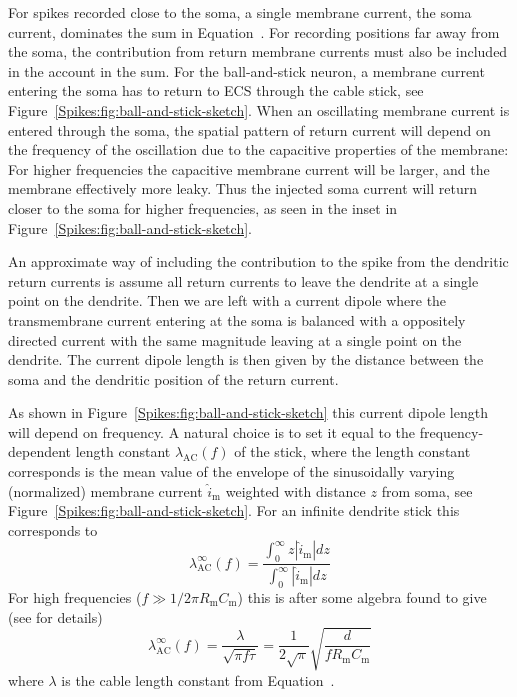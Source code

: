 For spikes recorded close to the soma, a single membrane current, the soma current,
dominates the sum in Equation~. 
For recording positions far away from the soma, the contribution from return membrane currents must also be included in the 
account in the sum. For the ball-and-stick neuron, a membrane current entering the soma has to return to ECS through the cable stick, see Figure~\ref{Spikes:fig:ball-and-stick-sketch}. When an oscillating membrane current is entered through the soma, the spatial pattern of return current will depend on the frequency of the oscillation due to the capacitive properties of the membrane: For higher frequencies the capacitive membrane current will be larger, and the membrane effectively more leaky. Thus the injected soma current will return closer to the soma for higher frequencies, as  seen in the inset in Figure~\ref{Spikes:fig:ball-and-stick-sketch}.  

An approximate way of including the contribution to the spike from the dendritic return currents is 
assume all return currents to leave the dendrite at a single point on the dendrite. Then we are left with
a current dipole where the transmembrane current entering at the soma is balanced with a oppositely directed current
with the same magnitude leaving at a single point on the dendrite. The current dipole length is then given by the distance
between the soma and the dendritic position of the return current. 

As shown in Figure~\ref{Spikes:fig:ball-and-stick-sketch} this current dipole length will depend on frequency.
A natural choice is to set it equal to the frequency-dependent length constant $\lambda_\mathrm{AC}(f)$ of the stick,
where the length constant corresponds is the mean value of the 
envelope of the sinusoidally varying (normalized) membrane current
$\hat{i}_\mathrm{m}$ weighted with distance $z$ from soma, see Figure~\ref{Spikes:fig:ball-and-stick-sketch}. 
For an infinite dendrite stick this corresponds to
%
\begin{equation}
  \lambda_\mathrm{AC}^\infty(f) = \frac{\int_0^\infty z |\hat{i}_\mathrm{m}| dz}{\int_0^\infty |\hat{i}_\mathrm{m}| dz} 
  \label{Spikes:equation:formula_lambda_ac}
\end{equation}
%
For high frequencies ($f \gg 1/2 \pi R_\mathrm{m} C_\mathrm{m}$) this is after some algebra 
found to give (see  for details)
%
\begin{equation}
 \lambda_\mathrm{AC}^\infty(f) =  \frac{\lambda}{\sqrt{\pi f \tau}} = 
  \frac{1}{2\sqrt{\pi}} \sqrt{\frac{d}{f R_\mathrm{m} C_\mathrm{m}}}
\label{Spikes:equation:approx_lambda_ac}
\end{equation}
%
where $\lambda$ is the cable length constant from Equation~.


